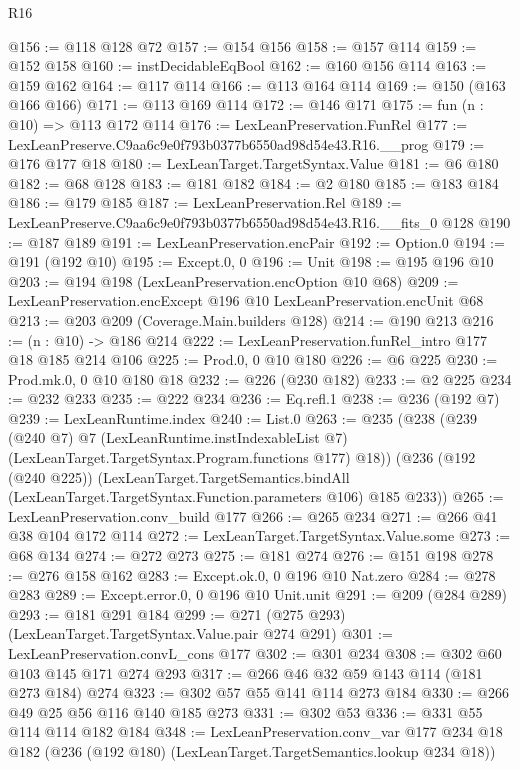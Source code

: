 \begin{lexlean}{R16}
\begin{coremodule}
@156 := @118 @128 @72
@157 := @154 @156
@158 := @157 @114
@159 := @152 @158
@160 := instDecidableEqBool
@162 := @160 @156 @114
@163 := @159 @162
@164 := @117 @114
@166 := @113 @164 @114
@169 := @150 (@163 @166 @166)
@171 := @113 @169 @114
@172 := @146 @171
@175 := fun (n : @10) => @113 @172 @114
@176 := LexLeanPreservation.FunRel
@177 := LexLeanPreserve.C9aa6c9e0f793b0377b6550ad98d54e43.R16.__prog
@179 := @176 @177 @18
@180 := LexLeanTarget.TargetSyntax.Value
@181 := @6 @180
@182 := @68 @128
@183 := @181 @182
@184 := @2 @180
@185 := @183 @184
@186 := @179 @185
@187 := LexLeanPreservation.Rel
@189 := LexLeanPreserve.C9aa6c9e0f793b0377b6550ad98d54e43.R16.__fits_0 @128
@190 := @187 @189
@191 := LexLeanPreservation.encPair
@192 := Option.{0}
@194 := @191 (@192 @10)
@195 := Except.{0, 0}
@196 := Unit
@198 := @195 @196 @10
@203 := @194 @198 (LexLeanPreservation.encOption @10 @68)
@209 := LexLeanPreservation.encExcept @196 @10 LexLeanPreservation.encUnit @68
@213 := @203 @209 (Coverage.Main.builders @128)
@214 := @190 @213
@216 := (n : @10) -> @186 @214
@222 := LexLeanPreservation.funRel_intro @177 @18 @185 @214 @106
@225 := Prod.{0, 0} @10 @180
@226 := @6 @225
@230 := Prod.mk.{0, 0} @10 @180 @18
@232 := @226 (@230 @182)
@233 := @2 @225
@234 := @232 @233
@235 := @222 @234
@236 := Eq.refl.{1}
@238 := @236 (@192 @7)
@239 := LexLeanRuntime.index
@240 := List.{0}
@263 := @235
    (@238
      (@239
        (@240 @7)
        @7
        (LexLeanRuntime.instIndexableList @7)
        (LexLeanTarget.TargetSyntax.Program.functions @177)
        @18))
    (@236
      (@192 (@240 @225))
      (LexLeanTarget.TargetSemantics.bindAll
        (LexLeanTarget.TargetSyntax.Function.parameters @106)
        @185
        @233))
@265 := LexLeanPreservation.conv_build @177
@266 := @265 @234
@271 := @266 @41 @38 @104 @172 @114
@272 := LexLeanTarget.TargetSyntax.Value.some
@273 := @68 @134
@274 := @272 @273
@275 := @181 @274
@276 := @151 @198
@278 := @276 @158 @162
@283 := Except.ok.{0, 0} @196 @10 Nat.zero
@284 := @278 @283
@289 := Except.error.{0, 0} @196 @10 Unit.unit
@291 := @209 (@284 @289)
@293 := @181 @291 @184
@299 := @271 (@275 @293) (LexLeanTarget.TargetSyntax.Value.pair @274 @291)
@301 := LexLeanPreservation.convL_cons @177
@302 := @301 @234
@308 := @302 @60 @103 @145 @171 @274 @293
@317 := @266 @46 @32 @59 @143 @114 (@181 @273 @184) @274
@323 := @302 @57 @55 @141 @114 @273 @184
@330 := @266 @49 @25 @56 @116 @140 @185 @273
@331 := @302 @53
@336 := @331 @55 @114 @114 @182 @184
@348 := LexLeanPreservation.conv_var
    @177
    @234
    @18
    @182
    (@236 (@192 @180) (LexLeanTarget.TargetSemantics.lookup @234 @18))

\end{coremodule}
\end{lexlean}
